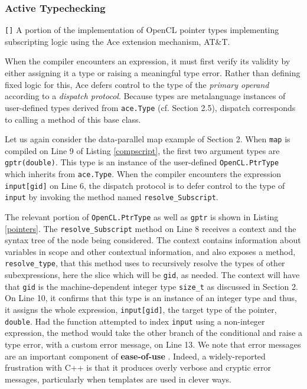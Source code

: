 \documentclass[9pt,preprint]{sigplanconf}
\begin{document}
\subsubsection{Active Typechecking}
\begin{codelisting}

\caption{\texttt{[]} A portion of the implementation of OpenCL pointer types implementing subscripting logic using the Ace extension mechanism, AT\&T.}
\label{pointers}
\end{codelisting}
When the compiler encounters an expression, it must first verify its validity by either assigning it a type or raising a meaningful type error. Rather than defining fixed logic for this, Ace defers control to the {type} of the \emph{primary operand} according to a {\em dispatch protocol}. Because types are metalanguage instances of user-defined types derived from \verb|ace.Type| (cf. Section 2.5), dispatch corresponds to calling a method of this base class.

Let us again consider the data-parallel map example of Section 2. When \verb|map| is compiled on Line 9 of Listing \ref{compscript}, the first two argument types are \verb|gptr(double)|. This type is an instance of the user-defined \verb|OpenCL.PtrType| which inherits from \verb|ace.Type|. When the compiler encounters the expression \verb|input[gid]| on Line 6, the dispatch protocol is to defer control to the type of \verb|input| by invoking the method named \verb|resolve_Subscript|.

The relevant portion of \verb|OpenCL.PtrType| as well as \verb|gptr| is shown in Listing \ref{pointers}. The \verb|resolve_Subscript| method on Line 8 receives a context and the syntax tree of the node being considered. The context contains information about variables in scope and other contextual information, and also exposes a method, \verb|resolve_type|, that this method uses to recursively resolve the types of other subexpressions, here the slice which will be \verb|gid|, as needed. The context will have that \verb|gid| is the machine-dependent integer type \verb|size_t| as discussed in Section 2. On Line 10, it confirms that this type is an instance of an integer type and thus, it assigns the whole expression, \verb|input[gid]|, the target type of the pointer, \verb|double|. Had the function attempted to index \verb|input| using a non-integer expression, the method would take the other branch of the conditional and raise a type error, with a custom error message, on Line 13. We note that error messages are an important component of \textbf{ease-of-use} \cite{marceau2011measuring}. Indeed, a widely-reported frustration with C++ is that it produces overly verbose and cryptic error messages, particularly when templates are used in clever ways.
\end{document}
